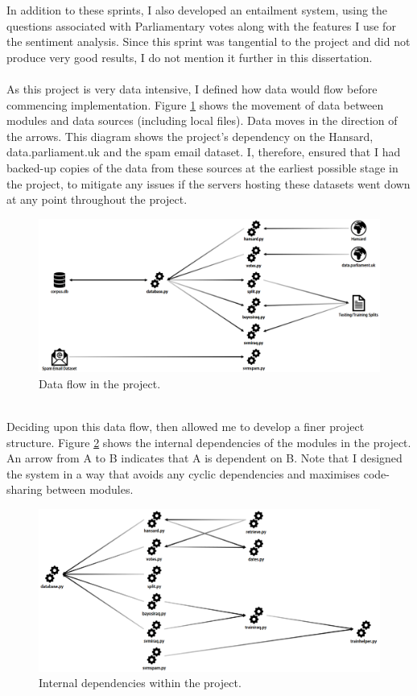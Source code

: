 \documentclass[12pt,a4paper,twoside,openright]{report}
\begin{document}
\vspace{5pt}
In addition to these sprints, I also developed an entailment system, using the questions associated with Parliamentary votes along with the features I use for the sentiment analysis. Since this sprint was tangential to the project and did not produce very good results, I do not mention it further in this dissertation.
\\\\
As this project is very data intensive, I defined how data would flow before commencing implementation. Figure \ref{fig:dataflow} shows the movement of data between modules and data sources (including local files). Data moves in the direction of the arrows. This diagram shows the project's dependency on the Hansard, data.parliament.uk and the spam email dataset. I, therefore, ensured that I had backed-up copies of the data from these sources at the earliest possible stage in the project, to mitigate any issues if the servers hosting these datasets went down at any point throughout the project.
\newline
\begin{figure}
	\includegraphics[width=\linewidth]{figs/dataflow3.png}
	\caption{Data flow in the project.}
	\label{fig:dataflow}
\end{figure}
\\
Deciding upon this data flow, then allowed me to develop a finer project structure. Figure \ref{fig:dependencies} shows the internal dependencies of the modules in the project. An arrow from A to B indicates that A is dependent on B. Note that I designed the system in a way that avoids any cyclic dependencies and maximises code-sharing between modules.

\begin{figure}
	\includegraphics[width=\linewidth]{figs/internaldependencies.png}
	\caption{Internal dependencies within the project.}
	\label{fig:dependencies}
\end{figure}
\end{document}
